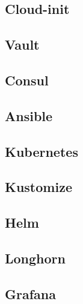 
\subsection{Cloud-init}


\subsection{Vault}


\subsection{Consul}


\subsection{Ansible}


\subsection{Kubernetes}


\subsection{Kustomize}


\subsection{Helm}


\subsection{Longhorn}


\subsection{Grafana}


